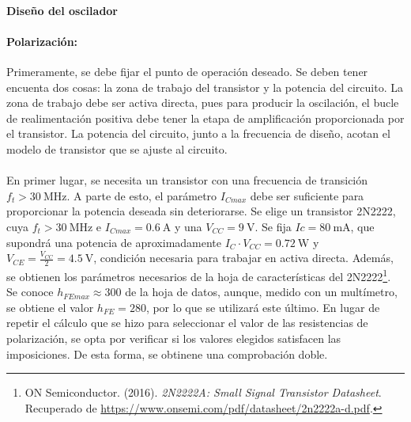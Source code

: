 \paragraph{Diseño del oscilador}
\paragraph{Polarizaci\'on:} %
Primeramente, se debe fijar el punto de operación deseado. Se deben tener encuenta dos cosas: la zona de trabajo del transistor y la potencia del circuito. La zona de trabajo debe ser activa directa, pues para producir la oscilación, el bucle de realimentación positiva debe tener la etapa de amplificación proporcionada por el transistor. La potencia del circuito, junto a la frecuencia de diseño, acotan el modelo de transistor que se ajuste al circuito.
\paragraph{}
En primer lugar, se necesita un transistor con una frecuencia de transición $f_t > \SI{30}{\mega\hertz}$. 
A parte de esto, el parámetro $I_{Cmax}$ debe ser suficiente para proporcionar la potencia deseada sin deteriorarse. Se elige un transistor 2N2222, cuya $f_t > \SI{30}{\mega\hertz}$ e $I_{Cmax} = \SI{0.6}{\ampere}$ y una $V_{CC} = \SI{9}{\volt}$. Se fija $Ic = \SI{80}{\milli\ampere}$, que supondr\'a una potencia de aproximadamente $I_C \cdot V_{CC} = \SI{0.72}{\watt}$ y $V_{CE} = \frac{V_{CC}}{2} = \SI{4.5}{\volt}$, condici\'on necesaria para trabajar en activa directa. Además, se obtienen los par\'ametros necesarios de la hoja de características del 2N2222\footnote{ON Semiconductor. (2016). \textit{2N2222A: Small Signal Transistor Datasheet}. Recuperado de \url{https://www.onsemi.com/pdf/datasheet/2n2222a-d.pdf}.}.
Se conoce $h_{FEmax} \approx 300$ de la hoja de datos, aunque, medido con un mult\'imetro, se obtiene el valor $h_{FE} = 280$, por lo que se utilizar\'a este \'ultimo.
En lugar de repetir el cálculo que se hizo para seleccionar el valor de las resistencias de polarización, se opta por verificar si los valores elegidos satisfacen las imposiciones. De esta forma, se obtinene una comprobaci\'on doble.
